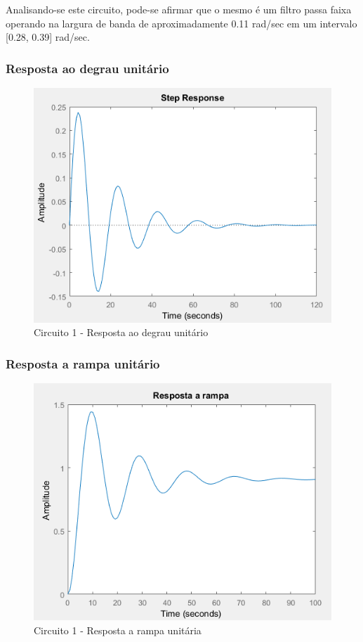\documentclass[a4paper, 12pt]{article}
\begin{document}
			Analisando-se este circuito, pode-se afirmar que o mesmo é um filtro passa faixa operando na largura de banda de aproximadamente 0.11 rad/sec em um intervalo [0.28, 0.39] rad/sec.
			\newpage
			\subsubsection{Resposta ao degrau unitário}
			\begin{figure}[!ht]
				\centering
				\includegraphics[scale=0.71]{img/1g_circ1.png}
				\caption{Circuito 1 - Resposta ao degrau unitário}
			\end{figure}
			\subsubsection{Resposta a rampa unitário}
			\begin{figure}[!ht]
				\centering
				\includegraphics[scale=0.72]{img/1h_circ1.png}
				\caption{Circuito 1 - Resposta a rampa unitária}
			\end{figure}
\end{document}
